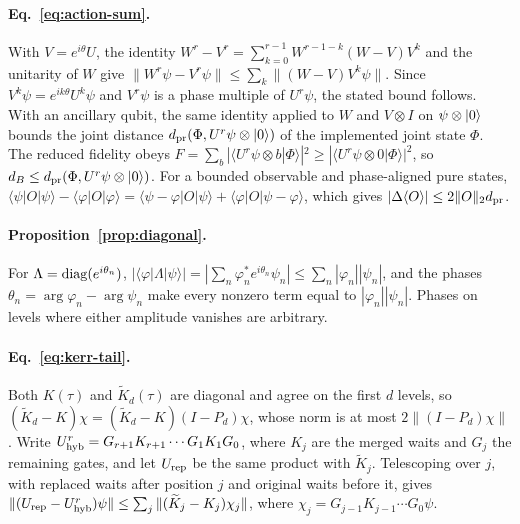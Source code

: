 \documentclass[pra,twocolumn,superscriptaddress,nofootinbib,floatfix]{revtex4-2}
\theoremstyle{remark}
\newcommand{\dpr}{d_{\rm pr}}
\begin{document}
\paragraph{Eq.~\eqref{eq:action-sum}.}
With \(V=e^{i\theta}U\), the identity \(W^r-V^r=\sum_{k=0}^{r-1}W^{r-1-k}(W-V)V^k\) and the unitarity of \(W\) give \(\|W^r\psi-V^r\psi\|\le\sum_k\|(W-V)V^k\psi\|\). Since \(V^k\psi=e^{ik\theta}U^k\psi\) and \(V^r\psi\) is a phase multiple of \(U^r\psi\), the stated bound follows. With an ancillary qubit, the same identity applied to \(W\) and \(V\otimes I\) on \(\psi\otimes\ket0\) bounds the joint distance \(\dpr(\Phi,U^r\psi\otimes\ket0)\) of the implemented joint state \(\Phi\). The reduced fidelity obeys \(F=\sum_b|\langle U^r\psi\otimes b|\Phi\rangle|^2\ge|\langle U^r\psi\otimes0|\Phi\rangle|^2\), so \(d_B\le\dpr(\Phi,U^r\psi\otimes\ket0)\). For a bounded observable and phase-aligned pure states, \(\langle\psi|O|\psi\rangle-\langle\varphi|O|\varphi\rangle=\langle\psi-\varphi|O|\psi\rangle+\langle\varphi|O|\psi-\varphi\rangle\), which gives \(|\Delta\langle O\rangle|\le2\|O\|_2\dpr\).

\paragraph{Proposition~\ref{prop:diagonal}.}
For \(\Lambda={\rm diag}(e^{i\theta_n})\), \(|\langle\varphi|\Lambda|\psi\rangle|=|\sum_n\varphi_n^*e^{i\theta_n}\psi_n|\le\sum_n|\varphi_n||\psi_n|\), and the phases \(\theta_n=\arg\varphi_n-\arg\psi_n\) make every nonzero term equal to \(|\varphi_n||\psi_n|\). Phases on levels where either amplitude vanishes are arbitrary.

\paragraph{Eq.~\eqref{eq:kerr-tail}.}
Both \(K(\tau)\) and \(\widetilde K_d(\tau)\) are diagonal and agree on the first \(d\) levels, so \((\widetilde K_d-K)\chi=(\widetilde K_d-K)(I-P_d)\chi\), whose norm is at most \(2\|(I-P_d)\chi\|\). Write \(U_{\rm hyb}^r=G_{r+1}K_{r+1}\cdots G_1K_1G_0\), where \(K_j\) are the merged waits and \(G_j\) the remaining gates, and let \(U_{\rm rep}\) be the same product with \(\widetilde K_j\). Telescoping over \(j\), with replaced waits after position \(j\) and original waits before it, gives \(\|(U_{\rm rep}-U_{\rm hyb}^r)\psi\|\le\sum_j\|(\widetilde K_j-K_j)\chi_j\|\), where \(\chi_j=G_{j-1}K_{j-1}\cdots G_0\psi\).
\end{document}
